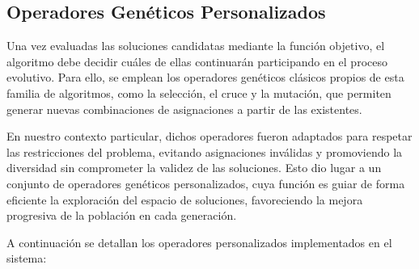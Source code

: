 

\subsection{Operadores Genéticos Personalizados}
\label{sec:operadores}

Una vez evaluadas las soluciones candidatas mediante la función objetivo, el algoritmo debe decidir cuáles de ellas continuarán participando en el proceso evolutivo. Para ello, se emplean los operadores genéticos clásicos propios de esta familia de algoritmos, como la selección, el cruce y la mutación, que permiten generar nuevas combinaciones de asignaciones a partir de las existentes.

En nuestro contexto particular, dichos operadores fueron adaptados para respetar las restricciones del problema, evitando asignaciones inválidas y promoviendo la diversidad sin comprometer la validez de las soluciones. Esto dio lugar a un conjunto de operadores genéticos personalizados, cuya función es guiar de forma eficiente la exploración del espacio de soluciones, favoreciendo la mejora progresiva de la población en cada generación.

A continuación se detallan los operadores personalizados implementados en el sistema:

